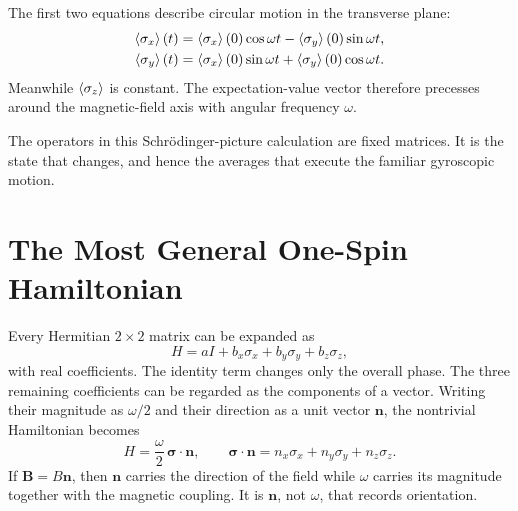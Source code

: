 The first two equations describe circular motion in the transverse plane:
\begin{align}
\left\langle\sigma_x\right\rangle(t)
&=\left\langle\sigma_x\right\rangle(0)\cos\omega t
-\left\langle\sigma_y\right\rangle(0)\sin\omega t,\\
\left\langle\sigma_y\right\rangle(t)
&=\left\langle\sigma_x\right\rangle(0)\sin\omega t
+\left\langle\sigma_y\right\rangle(0)\cos\omega t.
\end{align}
Meanwhile \(\left\langle\sigma_z\right\rangle\) is constant. The expectation-value vector therefore precesses around the magnetic-field axis with angular frequency \(\omega\).

The operators in this Schr\"odinger-picture calculation are fixed matrices. It is the state that changes, and hence the averages that execute the familiar gyroscopic motion.

\begin{classroomqa}
\end{classroomqa}

\section{The Most General One-Spin Hamiltonian}

Every Hermitian \(2\times2\) matrix can be expanded as
\begin{equation}
H=aI+b_x\sigma_x+b_y\sigma_y+b_z\sigma_z,
\end{equation}
with real coefficients. The identity term changes only the overall phase. The three remaining coefficients can be regarded as the components of a vector. Writing their magnitude as \(\omega/2\) and their direction as a unit vector \(\bm n\), the nontrivial Hamiltonian becomes
\begin{equation}
H=\frac{\omega}{2}\,\bm\sigma\cdot\bm n,
\qquad
\bm\sigma\cdot\bm n
=n_x\sigma_x+n_y\sigma_y+n_z\sigma_z.
\label{eq:l5-general-spin-h}
\end{equation}
If \(\bm B=B\bm n\), then \(\bm n\) carries the direction of the field while \(\omega\) carries its magnitude together with the magnetic coupling. It is \(\bm n\), not \(\omega\), that records orientation.

